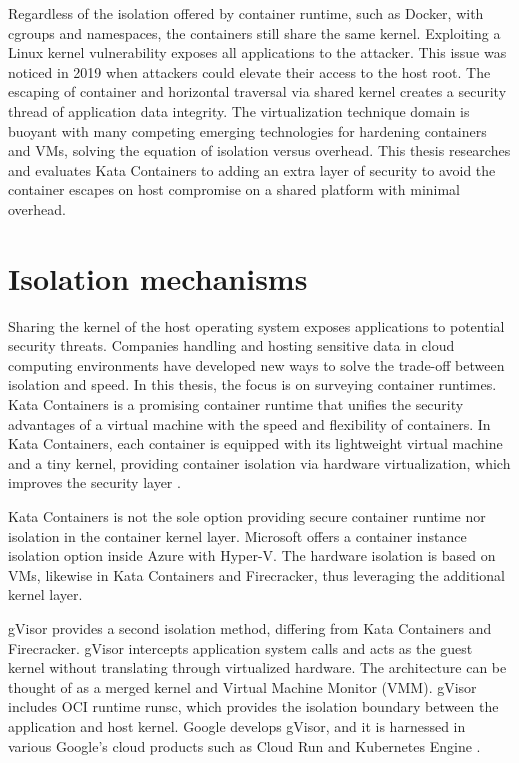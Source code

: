 Regardless of the isolation offered by container runtime, such as Docker, with cgroups and namespaces, the containers still share the same kernel. Exploiting a Linux kernel vulnerability exposes all applications to the attacker. This issue was noticed in 2019 \cite{CVE-2020-14386}\cite{CVE-2019-5736} when attackers could elevate their access to the host root. The escaping of container and horizontal traversal via shared kernel creates a security thread of application data integrity. The virtualization technique domain is buoyant with many competing emerging technologies for hardening containers and VMs, solving the equation of isolation versus overhead. This thesis researches and evaluates Kata Containers to adding an extra layer of security to avoid the container escapes on host compromise on a shared platform with minimal overhead. \cite{EdgeComputing5G}

\section{Isolation mechanisms}
\label{section:isolation}

Sharing the kernel of the host operating system exposes applications to potential security threats. Companies handling and hosting sensitive data in cloud computing environments have developed new ways to solve the trade-off between isolation and speed. In this thesis, the focus is on surveying container runtimes. Kata Containers is a promising container runtime that unifies the security advantages of a virtual machine with the speed and flexibility of containers. In Kata Containers, each container is equipped with its lightweight virtual machine and a tiny kernel, providing container isolation via hardware virtualization, which improves the security layer \cite{Kumar2020}.

Kata Containers is not the sole option providing secure container runtime nor isolation in the container kernel layer. Microsoft offers a container instance isolation option inside Azure with Hyper-V. The hardware isolation is based on VMs, likewise in Kata Containers and Firecracker, thus leveraging the additional kernel layer. \cite{Hyper-V}

gVisor provides a second isolation method, differing from Kata Containers and Firecracker. gVisor intercepts application system calls and acts as the guest kernel without translating through virtualized hardware. The architecture can be thought of as a merged kernel and Virtual Machine Monitor (VMM). gVisor includes OCI runtime runsc, which provides the isolation boundary between the application and host kernel. Google develops gVisor, and it is harnessed in various Google's cloud products such as Cloud Run \cite{CloudRun} and Kubernetes Engine \cite{GKE}. \cite{Debab2021}\cite{gVisor}

